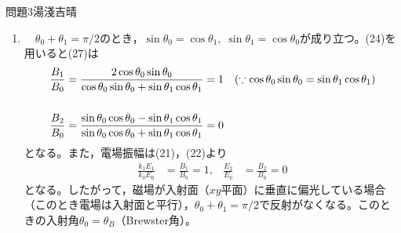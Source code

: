 \documentclass[fleqn]{jbook}
\begin{document}
\begin{answer}{問題3}{湯淺吉晴}
\begin{enumerate}
\begin{enumerate}
\item 　$\theta_0 + \theta_1 = \pi/2$のとき，$\sin \theta_0 = \cos \theta_1,\;\sin \theta_1 = \cos \theta_0$が成り立つ。(24)を用いると(27)は
\begin{align}
\frac{B_1}{B_0} &= \frac{2\cos \theta_0\sin \theta_0}{\cos \theta_0\sin \theta_0 + \sin \theta_1\cos \theta_1} = 1 && (\because \cos \theta_0\sin \theta_0 = \sin \theta_1\cos \theta_1) \\
&\cr
\frac{B_2}{B_0} &= \frac{\sin \theta_0\cos \theta_0 - \sin \theta_1\cos \theta_1}{\sin \theta_0\cos \theta_0 + \sin \theta_1\cos \theta_1} = 0 &&
\end{align}
となる。また，電場振幅は(21)，(22)より
\begin{align}
\frac{k_1E_1}{k_0E_0} &= \frac{B_1}{B_0} = 1, & \frac{E_2}{E_0} &= \frac{B_2}{B_0} = 0
\end{align}
となる。したがって，磁場が入射面（$xy$平面）に垂直に偏光している場合（このとき電場は入射面と平行），$\theta_0 + \theta_1 = \pi/2$で反射がなくなる。このときの入射角$\theta_0 = \theta_B$（Brewster角）。\\
\end{enumerate}
\end{enumerate}


\end{answer}
\end{document}
